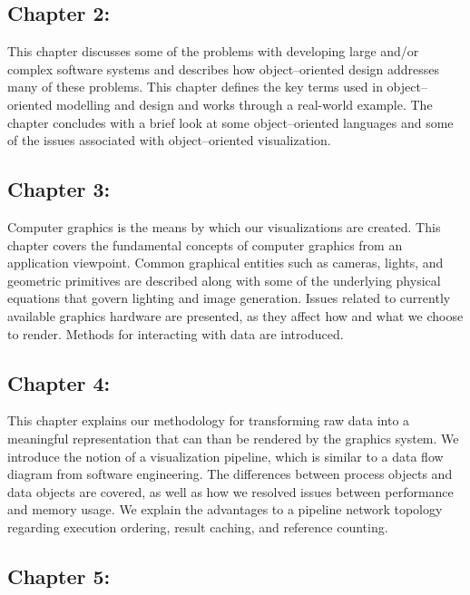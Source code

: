 \subsection*{Chapter 2: }

This chapter discusses some of the problems with developing large and/or complex software systems and describes how object--oriented design addresses many of these problems. This chapter defines the key terms used in object--oriented modelling and design and works through a real-world example. The chapter concludes with a brief look at some object--oriented languages and some of the issues associated with object--oriented visualization.

\subsection*{Chapter 3: }

Computer graphics is the means by which our visualizations are created. This chapter covers the fundamental concepts of computer graphics from an application viewpoint. Common graphical entities such as cameras, lights, and geometric primitives are described along with some of the underlying physical equations that govern lighting and image generation. Issues related to currently available graphics hardware are presented, as they affect how and what we choose to render. Methods for interacting with data are introduced.

\subsection*{Chapter 4: }

This chapter explains our methodology for transforming raw data into a meaningful representation that can than be rendered by the graphics system. We introduce the notion of a visualization pipeline, which is similar to a data flow diagram from software engineering. The differences between process objects and data objects are covered, as well as how we resolved issues between performance and memory usage. We explain the advantages to a pipeline network topology regarding execution ordering, result caching, and reference counting.

\subsection*{Chapter 5: }

